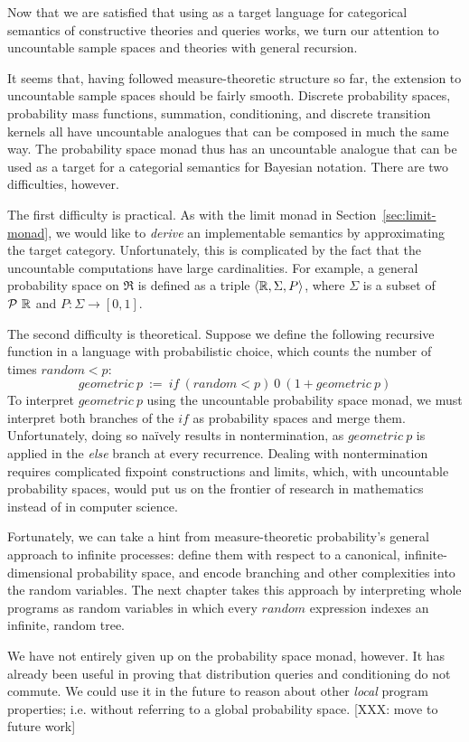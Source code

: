 Now that we are satisfied that using \lzfclang as a target language for categorical semantics of constructive theories and queries works, we turn our attention to uncountable sample spaces and theories with general recursion.

It seems that, having followed measure-theoretic structure so far, the extension to uncountable sample spaces should be fairly smooth.
Discrete probability spaces, probability mass functions, summation, conditioning, and discrete transition kernels all have uncountable analogues that can be composed in much the same way.
The probability space monad thus has an uncountable analogue that can be used as a target for a categorial semantics for Bayesian notation.
There are two difficulties, however.

The first difficulty is practical.
As with the limit monad in Section~\ref{sec:limit-monad}, we would like to \emph{derive} an implementable semantics by approximating the target category.
Unfortunately, this is complicated by the fact that the uncountable computations have large cardinalities.
For example, a general probability space on $\Re$ is defined as a triple $\langle{\mathbb{R},\Sigma,P}\rangle$, where $\Sigma$ is a subset of $\mathcal{P}~\mathbb{R}$ and $P : \Sigma \to [0,1]$.

The second difficulty is theoretical.
Suppose we define the following recursive function in a language with probabilistic choice, which counts the number of times $random < p$:
\begin{equation}
	geometric~p \ := \ if~(random < p)~0~(1 + geometric~p)
\end{equation}
To interpret $geometric~p$ using the uncountable probability space monad, we must interpret both branches of the $if$ as probability spaces and merge them.
Unfortunately, doing so na\"ively results in nontermination, as $geometric~p$ is applied in the \emph{else} branch at every recurrence.
Dealing with nontermination requires complicated fixpoint constructions and limits, which, with uncountable probability spaces, would put us on the frontier of research in mathematics instead of in computer science.

Fortunately, we can take a hint from measure-theoretic probability's general approach to infinite processes: define them with respect to a canonical, infinite-dimensional probability space, and encode branching and other complexities into the random variables.
The next chapter takes this approach by interpreting whole programs as random variables in which every $random$ expression indexes an infinite, random tree.

We have not entirely given up on the probability space monad, however.
It has already been useful in proving that distribution queries and conditioning do not commute.
We could use it in the future to reason about other \emph{local} program properties; i.e. without referring to a global probability space. [XXX: move to future work]

